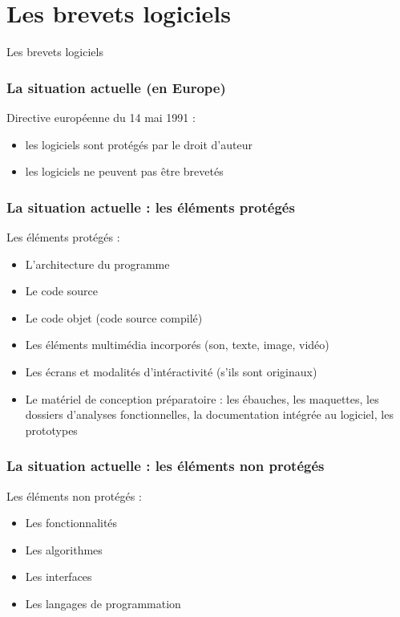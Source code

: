 \documentclass{beamer}
\begin{document}

\section{Les brevets logiciels}
\begin{frame}
\begin{center}
{\LARGE Les brevets logiciels}
\end{center}
\end{frame}

\begin{frame}
\frametitle{La situation actuelle (en Europe)}
Directive européenne du 14 mai 1991 :
\begin{itemize}
	\item les logiciels sont protégés par le droit d'auteur
	\item les logiciels ne peuvent pas être brevetés
\end{itemize}
\end{frame}

\begin{frame}
\frametitle{La situation actuelle : les éléments protégés}
Les éléments protégés :
\begin{itemize}
	\item L'architecture du programme
	\item Le code source
	\item Le code objet (code source compilé)
	\item Les éléments multimédia incorporés (son, texte, image, vidéo)
	\item Les écrans et modalités d'intéractivité (s'ils sont originaux)
	\item Le matériel de conception préparatoire : les ébauches, les maquettes, les dossiers d'analyses fonctionnelles, la documentation intégrée au logiciel, les prototypes
\end{itemize}
\end{frame}

\begin{frame}
\frametitle{La situation actuelle : les éléments non protégés}
Les éléments non protégés :
\begin{itemize}
	\item Les fonctionnalités
	\item Les algorithmes
	\item Les interfaces
	\item Les langages de programmation
\end{itemize}
\end{frame}
\end{document}
